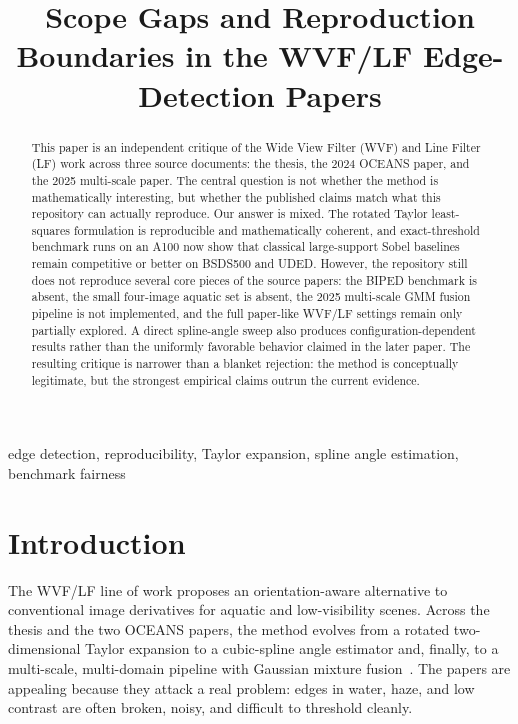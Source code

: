 \documentclass[conference]{IEEEtran}
\begin{document}
\title{Scope Gaps and Reproduction Boundaries in the WVF/LF Edge-Detection Papers}

\author{
}

\maketitle

\begin{abstract}
This paper is an independent critique of the Wide View Filter (WVF) and Line Filter (LF) work across three source documents: the thesis, the 2024 OCEANS paper, and the 2025 multi-scale paper. The central question is not whether the method is mathematically interesting, but whether the published claims match what this repository can actually reproduce. Our answer is mixed. The rotated Taylor least-squares formulation is reproducible and mathematically coherent, and exact-threshold benchmark runs on an A100 now show that classical large-support Sobel baselines remain competitive or better on BSDS500 and UDED. However, the repository still does not reproduce several core pieces of the source papers: the BIPED benchmark is absent, the small four-image aquatic set is absent, the 2025 multi-scale GMM fusion pipeline is not implemented, and the full paper-like WVF/LF settings remain only partially explored. A direct spline-angle sweep also produces configuration-dependent results rather than the uniformly favorable behavior claimed in the later paper. The resulting critique is narrower than a blanket rejection: the method is conceptually legitimate, but the strongest empirical claims outrun the current evidence.
\end{abstract}

\begin{IEEEkeywords}
edge detection, reproducibility, Taylor expansion, spline angle estimation, benchmark fairness
\end{IEEEkeywords}

\section{Introduction}

The WVF/LF line of work proposes an orientation-aware alternative to conventional image derivatives for aquatic and low-visibility scenes. Across the thesis and the two OCEANS papers, the method evolves from a rotated two-dimensional Taylor expansion to a cubic-spline angle estimator and, finally, to a multi-scale, multi-domain pipeline with Gaussian mixture fusion~\cite{bagan2023thesis,bagan2024oceans,bagan2025oceans}. The papers are appealing because they attack a real problem: edges in water, haze, and low contrast are often broken, noisy, and difficult to threshold cleanly.
\end{document}
